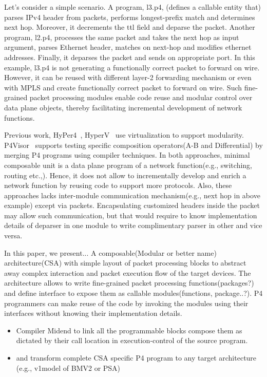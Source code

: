 \documentclass[10pt,sigconf,letterpaper,anonymous]{acmart}
\begin{document}
Let's consider a simple scenario. A program, l3.p4, (defines a callable entity that) parses IPv4 header from packets, performs longest-prefix match and determines next hop. 
Moreover, it decrements the ttl field and deparse the packet. 
Another program, l2.p4, processes the same packet and takes the next hop as input argument, parses Ethernet header, matches on next-hop and modifies ethernet addresses.
Finally, it deparses the packet and sends on appropriate port.
In this example, l3.p4 is not generating a functionally correct packet to forward on wire. 
However, it can be reused with different layer-2 forwarding mechanism or even with MPLS and create functionally correct packet to forward on wire.
Such fine-grained packet processing modules enable code reuse and modular control over data plane objects, thereby facilitating incremental development of network functions. 

                        



Previous work, HyPer4~\cite{Hancock:2016:HUP:2999572.2999607}, HyperV~\cite{8038396} use virtualization to support modularity.
P4Visor~\cite{Zheng:2018:PLV:3281411.3281436} supports testing specific composition operators(A-B and Differential) by merging P4 programs using compiler techniques.
In both approaches, minimal composable unit is a data plane program of a network function(e.g., switching, routing etc.,). 
Hence, it does not allow to incrementally develop and enrich a network function by reusing code to support more protocols.
Also, these approaches lacks inter-module communication mechanism(e.g., next hop in above example) except via packets.
Encapsulating customized headers inside the packet may allow such communication, but that would require to know
implementation details of deparser in one module to write complimentary parser in other and vice versa. 


In this paper, we present...
A composable(Modular or better name) architecture(CSA) with simple layout of packet processing blocks to abstract away complex interaction and packet execution flow of the target devices.
The architecture allows to write fine-grained packet processing functions(packages?) and define interface to expose them as callable modules(functions, package..?).
P4 programmers can make reuse of the code by invoking the modules using their interfaces without knowing their implementation details.
\begin{itemize}
 \item Compiler Midend to link all the programmable blocks compose them as dictated by their call location in execution-control of the source program.
 \item and transform complete CSA specific P4 program to any target architecture (e.g., v1model of BMV2 or PSA)
\end{itemize}
\end{document}
